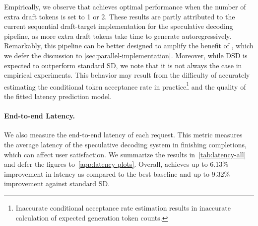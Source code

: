 Empirically, we observe that \alg{} achieves optimal performance when the number of extra draft tokens is set to 1 or 2.
These results are partly attributed to the current sequential draft-target implementation for the speculative decoding pipeline, as more extra draft tokens take time to generate autoregressively.
Remarkably, this pipeline can be better designed to amplify the benefit of \alg{}, which we defer the discussion to \cref{sec:parallel-implementation}.
Moreover, while DSD is expected to outperform standard SD, we note that it is not always the case in empirical experiments.
This behavior may result from the difficulty of accurately estimating the conditional token acceptance rate in practice\footnote{Inaccurate conditional acceptance rate estimation results in inaccurate calculation of expected generation token counts.} and the quality of the fitted latency prediction model.


\paragraph{End-to-end Latency.}
We also measure the end-to-end latency of each request.
This metric measures the average latency of the speculative decoding system in finishing completions, which can affect user satisfaction.
We summarize the results in~\cref{tab:latency-all} and defer the figures to~\cref{app:latency-plots}.
Overall, \alg{} achieves up to 6.13\% improvement in latency as compared to the best baseline and up to 9.32\% improvement against standard SD.
\begin{table}[!ht]
\centering
\caption{Improvement in end-to-end latency. Refer to~\cref{fig:throughput-all} for definitions of $\uparrow$ and $\Delta$. The reported
numbers reflect the mean over 3 independent trials.}
\label{tab:latency-all}
\vspace{-3mm}
\end{table}

